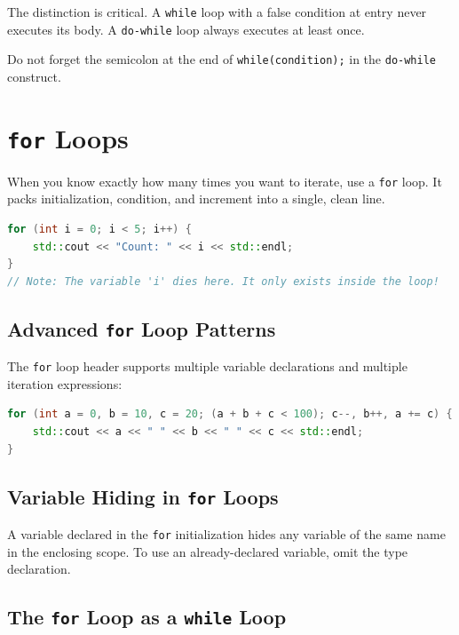 The distinction is critical. A \texttt{while} loop with a false condition at entry never executes its body. A \texttt{do-while} loop always executes at least once.

Do not forget the semicolon at the end of \texttt{while(condition);} in the \texttt{do-while} construct.

\section{\texttt{for} Loops}
\label{sec:for-loops}

When you know exactly how many times you want to iterate, use a \texttt{for} loop. It packs initialization, condition, and increment into a single, clean line.

\begin{lstlisting}[language=C++, caption={Basic for loop}]
for (int i = 0; i < 5; i++) {
    std::cout << "Count: " << i << std::endl;
}
// Note: The variable 'i' dies here. It only exists inside the loop!
\end{lstlisting}

\subsection{Advanced \texttt{for} Loop Patterns}

The \texttt{for} loop header supports multiple variable declarations and multiple iteration expressions:

\begin{lstlisting}[language=C++, caption={Multi-variable for loop}]
for (int a = 0, b = 10, c = 20; (a + b + c < 100); c--, b++, a += c) {
    std::cout << a << " " << b << " " << c << std::endl;
}
\end{lstlisting}

\subsection{Variable Hiding in \texttt{for} Loops}

A variable declared in the \texttt{for} initialization hides any variable of the same name in the enclosing scope. To use an already-declared variable, omit the type declaration.

\subsection{The \texttt{for} Loop as a \texttt{while} Loop}

